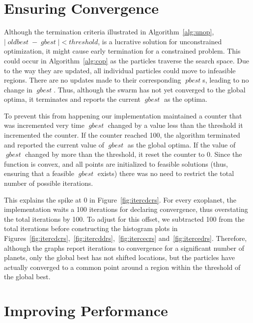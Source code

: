 \documentclass[10pt,draft]{article}
\DeclareMathOperator*{\pbest}{\mathit{pbest}}
\DeclareMathOperator*{\gbest}{\mathit{gbest}}
\DeclareMathOperator*{\oldbest}{\mathit{oldbest}}
\begin{document}
\begin{appendices}

  \pagebreak
  \section{Ensuring Convergence}\label{app:con}

  Although the termination criteria illustrated in Algorithm~\ref{alg:unop}, $|\oldbest-\gbest| < \mathit{threshold}$,
  is a lucrative solution for unconstrained optimization, it might cause early termination for a constrained problem.
  This could occur in Algorithm~\ref{alg:cop} as the particles traverse the search space. Due to the way they are
  updated, all individual particles could move to infeasible regions. There are no updates made to their corresponding
  $\pbest$s, leading to no change in $\gbest$. Thus, although the swarm has not yet converged to the global optima, it
  terminates and reports the current $\gbest$ as the optima.

  To prevent this from happening our implementation maintained a counter that was incremented very time $\gbest$ changed
  by a value less than the threshold it incremented the counter. If the counter reached \num{100}, the algorithm
  terminated and reported the current value of $\gbest$ as the global optima. If the value of $\gbest$ changed by more
  than the threshold, it reset the counter to $\num{0}$. Since the function is convex, and all points are initialized to
  feasible solutions (thus, ensuring that a feasible $\gbest$ exists) there was no need to restrict the total number of
  possible iterations.

  This explains the spike at \num{0} in Figure~\ref{fig:itercdcrs}. For every exoplanet, the implementation waits a
  \num{100} iterations for declaring convergence, thus overstating the total iterations by \num{100}. To adjust for this
  offset, we subtracted \num{100} from the total iterations before constructing the histogram plots in
  Figures~\ref{fig:itercdcrs},~\ref{fig:itercddrs},~\ref{fig:itercecrs} and~\ref{fig:itercedrs}. Therefore, although the
  graphs report iterations to convergence for a significant number of planets, only the global best has not shifted
  locations, but the particles have actually converged to a common point around a region within the threshold of the
  global best.

  \section{Improving Performance}\label{app:imp}


\end{appendices}
\end{document}
